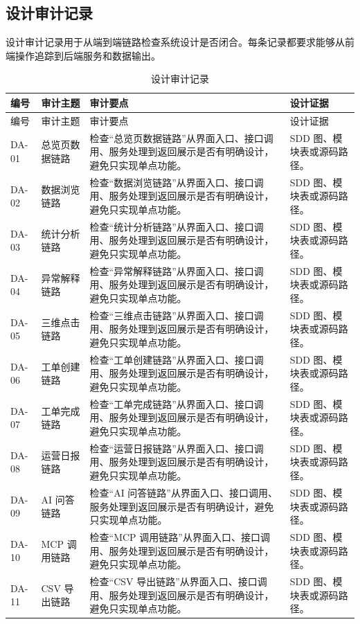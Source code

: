 \documentclass[12pt,a4paper]{ctexart}
\begin{document}
\subsection{设计审计记录}
设计审计记录用于从端到端链路检查系统设计是否闭合。每条记录都要求能够从前端操作追踪到后端服务和数据输出。
\begin{longtable}{L{1.7cm}L{4.0cm}L{6.2cm}L{3.6cm}}
\caption{设计审计记录}\\
\toprule
编号 & 审计主题 & 审计要点 & 设计证据 \\
\midrule
\endfirsthead
\toprule
编号 & 审计主题 & 审计要点 & 设计证据 \\
\midrule
\endhead
DA-01 & 总览页数据链路 & 检查“总览页数据链路”从界面入口、接口调用、服务处理到返回展示是否有明确设计，避免只实现单点功能。 & SDD 图、模块表或源码路径。 \\
DA-02 & 数据浏览链路 & 检查“数据浏览链路”从界面入口、接口调用、服务处理到返回展示是否有明确设计，避免只实现单点功能。 & SDD 图、模块表或源码路径。 \\
DA-03 & 统计分析链路 & 检查“统计分析链路”从界面入口、接口调用、服务处理到返回展示是否有明确设计，避免只实现单点功能。 & SDD 图、模块表或源码路径。 \\
DA-04 & 异常解释链路 & 检查“异常解释链路”从界面入口、接口调用、服务处理到返回展示是否有明确设计，避免只实现单点功能。 & SDD 图、模块表或源码路径。 \\
DA-05 & 三维点击链路 & 检查“三维点击链路”从界面入口、接口调用、服务处理到返回展示是否有明确设计，避免只实现单点功能。 & SDD 图、模块表或源码路径。 \\
DA-06 & 工单创建链路 & 检查“工单创建链路”从界面入口、接口调用、服务处理到返回展示是否有明确设计，避免只实现单点功能。 & SDD 图、模块表或源码路径。 \\
DA-07 & 工单完成链路 & 检查“工单完成链路”从界面入口、接口调用、服务处理到返回展示是否有明确设计，避免只实现单点功能。 & SDD 图、模块表或源码路径。 \\
DA-08 & 运营日报链路 & 检查“运营日报链路”从界面入口、接口调用、服务处理到返回展示是否有明确设计，避免只实现单点功能。 & SDD 图、模块表或源码路径。 \\
DA-09 & AI 问答链路 & 检查“AI 问答链路”从界面入口、接口调用、服务处理到返回展示是否有明确设计，避免只实现单点功能。 & SDD 图、模块表或源码路径。 \\
DA-10 & MCP 调用链路 & 检查“MCP 调用链路”从界面入口、接口调用、服务处理到返回展示是否有明确设计，避免只实现单点功能。 & SDD 图、模块表或源码路径。 \\
DA-11 & CSV 导出链路 & 检查“CSV 导出链路”从界面入口、接口调用、服务处理到返回展示是否有明确设计，避免只实现单点功能。 & SDD 图、模块表或源码路径。 \\

\end{longtable}
\end{document}
